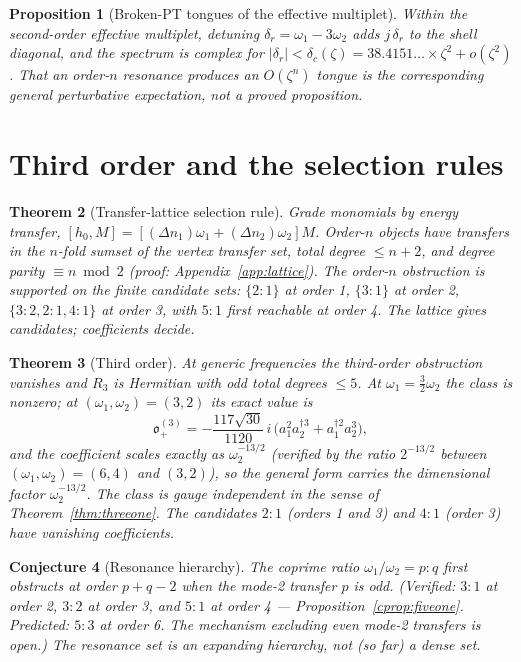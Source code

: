 \documentclass[11pt]{article}
\newtheorem{theorem}{Theorem}[section]
\newtheorem{proposition}[theorem]{Proposition}
\newtheorem{conjecture}[theorem]{Conjecture}
\theoremstyle{definition}
\theoremstyle{remark}
\newcommand{\w}{\omega}
\newcommand{\dg}{\dagger}
\newcommand{\ob}{\mathfrak o}
\begin{document}
\begin{proposition}[Broken-PT tongues of the effective multiplet]
Within the second-order effective multiplet, detuning
$\delta_r=\w_1-3\w_2$ adds $j\,\delta_r$ to the shell diagonal, and the
spectrum is complex for
$|\delta_r|<\delta_c(\zeta)=38.4151\ldots\times\zeta^2+o(\zeta^2)$.
That an order-$n$ resonance produces an $O(\zeta^n)$ tongue is the
corresponding general perturbative expectation, not a proved
proposition.
\end{proposition}

\section{Third order and the selection rules}\label{sec:selection}

\begin{theorem}[Transfer-lattice selection rule]\label{thm:selection}
Grade monomials by energy transfer, $[h_0,M]=[(\Delta n_1)\w_1
+(\Delta n_2)\w_2]M$.  Order-$n$ objects have transfers in the $n$-fold
sumset of the vertex transfer set, total degree $\le n+2$, and degree
parity $\equiv n\bmod2$ (proof: Appendix~\ref{app:lattice}).  The
order-$n$ obstruction is supported on the finite candidate sets:
$\{2{:}1\}$ at order 1, $\{3{:}1\}$ at order 2,
$\{3{:}2,2{:}1,4{:}1\}$ at order 3, with $5{:}1$ first reachable at
order 4.  The lattice gives candidates; coefficients decide.
\end{theorem}

\begin{theorem}[Third order]\label{thm:third}
At generic frequencies the third-order obstruction vanishes and $R_3$
is Hermitian with odd total degrees $\le5$.  At $\w_1=\tfrac32\w_2$ the
class is nonzero; at $(\w_1,\w_2)=(3,2)$ its exact value is
\begin{equation}
\ob_+^{(3)}
=-\frac{117\sqrt{30}}{1120}\,i\,
\big(a_1^2a_2^{\dg3}+a_1^{\dg2}a_2^3\big),
\end{equation}
and the coefficient scales exactly as $\w_2^{-13/2}$ (verified by the
ratio $2^{-13/2}$ between $(\w_1,\w_2)=(6,4)$ and $(3,2)$), so the
general form carries the dimensional factor $\w_2^{-13/2}$.  The class
is gauge independent in the sense of Theorem~\ref{thm:threeone}.  The
candidates $2{:}1$ (orders 1 and 3) and $4{:}1$ (order 3) have
vanishing coefficients.
\end{theorem}

\begin{conjecture}[Resonance hierarchy]\label{conj:hierarchy}
The coprime ratio $\w_1/\w_2=p{:}q$ first obstructs at order $p+q-2$
when the mode-2 transfer $p$ is odd.  (Verified: $3{:}1$ at order 2,
$3{:}2$ at order 3, and $5{:}1$ at order 4 ---
Proposition~\ref{cprop:fiveone}.  Predicted: $5{:}3$ at order 6.  The
mechanism excluding even mode-2 transfers is open.)  The
resonance set is an expanding hierarchy, not (so far) a dense set.
\end{conjecture}
\end{document}
